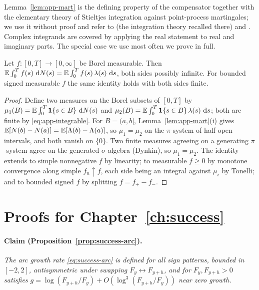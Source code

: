 Lemma~\ref{lem:app-mart} is the defining property of the compensator together with the elementary
theory of Stieltjes integration against point-process martingales; we use it without proof and refer
to \cite{bremaud1996} (the integration theory recalled there) and \cite[Ch.~7]{daley2003}. Complex
integrands are covered by applying the real statement to real and imaginary parts. The special case
we use most often we prove in full.

\begin{lemma}
\label{lem:app-fubini}
Let $f : [0,T] \to [0,\infty]$ be Borel measurable. Then $\mathbb{E} \int_0^T f(s)\, \,\mathrm{d} N(s) = \mathbb{E} \int_0^T
f(s)\, \lambda(s)\, \,\mathrm{d} s$, both sides possibly infinite. For bounded signed measurable $f$ the same
identity holds with both sides finite.
\end{lemma}

\begin{proof}
Define two measures on the Borel subsets of $[0,T]$ by $\mu_1(B) = \mathbb{E} \int_0^T \mathbf{1}\{s \in B\}\, \,\mathrm{d}
N(s)$ and $\mu_2(B) = \mathbb{E} \int_0^T \mathbf{1}\{s \in B\}\, \lambda(s)\, \,\mathrm{d} s$; both are finite by
\eqref{eq:app-integrable}. For $B = (a,b]$, Lemma~\ref{lem:app-mart}(i) gives $\mathbb{E}[N(b) - N(a)] =
\mathbb{E}[\Lambda(b) - \Lambda(a)]$, so $\mu_1 = \mu_2$ on the $\pi$-system of half-open intervals, and
both vanish on $\{0\}$. Two finite measures agreeing on a generating $\pi$-system agree on the
generated $\sigma$-algebra (Dynkin), so $\mu_1 = \mu_2$. The identity extends to simple nonnegative
$f$ by linearity; to measurable $f \ge 0$ by monotone convergence along simple $f_n \uparrow f$,
each side being an integral against $\mu_i$ by Tonelli; and to bounded signed $f$ by splitting $f =
f_+ - f_-$.
\end{proof}

\section{Proofs for Chapter~\ref{ch:success}}
\label{app:proofs-ch3}

\paragraph{Claim (Proposition~\ref{prop:success-arc}).}
\emph{The arc growth rate \eqref{eq:success-arc} is defined for all sign patterns, bounded in
$[-2,2]$, antisymmetric under swapping $F_y \leftrightarrow F_{y+h}$, and for $F_y, F_{y+h} > 0$
satisfies $g = \log(F_{y+h}/F_y) + O(\log^3(F_{y+h}/F_y))$ near zero growth.}

